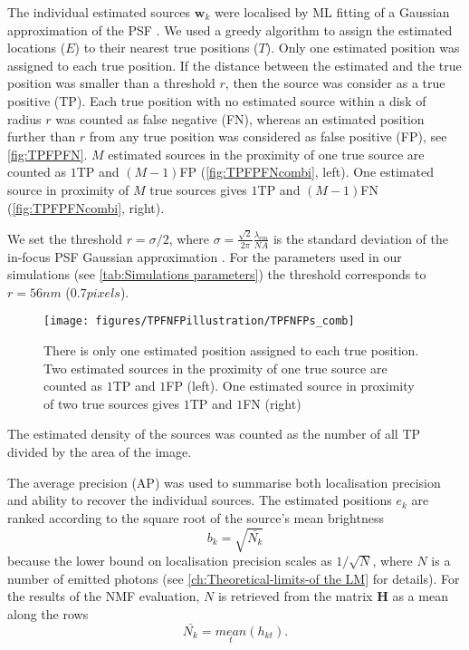 The individual estimated sources $\bm{w}_k$ were localised by ML fitting of a Gaussian approximation of the PSF \cite{Zhang2007}. We used a greedy algorithm to assign the estimated locations ($E$) to their nearest true positions ($T$). Only one estimated position was assigned to each true position. If the distance between the estimated and the true position was smaller than a threshold $r$, then the source was consider as a true positive (TP). Each true position with no estimated source within a disk of radius $r$ was counted as false negative (FN), whereas an estimated position further than $r$ from any true position was considered as false positive (FP), see \autoref{fig:TPFPFN}. $M$ estimated sources in the proximity of one true source are counted as $1$TP and $(M-1)$FP (\autoref{fig:TPFPFNcombi}, left). One estimated source in proximity of $M$ true sources gives $1$TP and $(M-1)$FN (\autoref{fig:TPFPFNcombi}, right).

We set the threshold $r=\sigma/2$, where $\sigma=\frac{\sqrt{2}}{2\pi}\frac{\lambda_{em}}{NA}$ is the standard deviation of the in-focus PSF Gaussian approximation \cite{Zhang2007}. For the parameters used in our simulations (see \autoref{tab:Simulations parameters}) the threshold corresponds to $r=56\unit{nm}$ ($0.7\unit{pixels}$). 

\begin{figure}[!tb]
	\centering
	\texttt{[image: figures/TPFNFPillustration/TPFNFPs\_comb]}
	\caption{There is only one estimated position assigned to each true position. Two estimated sources in the proximity of one true source are counted as $1$TP and $1$FP (left). One estimated source in proximity of two true sources gives $1$TP and $1$FN (right)}
	\label{fig:TPFPFNcombi}
\end{figure}

The estimated density of the sources was counted as the number of all TP divided by the area of the image.

The average precision (AP) \cite{Salton1986,Everingham2009} was used to summarise both localisation precision and ability to recover the individual sources. The estimated positions $e_k$ are ranked according to the square root of the source's mean brightness
%
\begin{equation}
	b_k=\sqrt{\bar{N_k}}
\end{equation}
%
because the \CR lower bound on localisation precision scales as $1/\sqrt{N}$, where $N$ is a number of emitted photons (see \autoref{ch:Theoretical-limits-of the LM} for details). For the results of the NMF evaluation, $N$ is retrieved from the matrix $\bm{H}$ as a mean along the rows
%
\begin{equation}
	\bar{N_k}=\underset{t}{\unit{mean}}(h_{kt}).
\end{equation}

